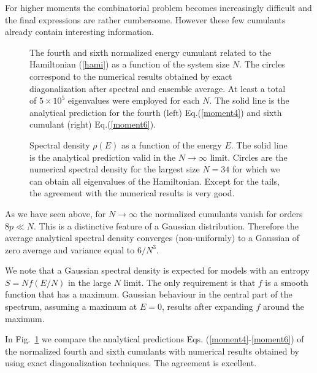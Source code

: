 \documentclass[aps,showpacs,floatfix,superscriptaddress,pre,11pt]{revtex4-1}
\begin{document}
 For higher moments the combinatorial problem becomes increasingly difficult and the final expressions
 are rather cumbersome. However these few cumulants already contain interesting information. 
  \begin{figure}[t!]%
  	\centering
  	\caption{The fourth and sixth normalized energy cumulant related to the Hamiltonian (\ref{hami}) as a function of the system size $N$. The circles correspond to the numerical results obtained by exact diagonalization after spectral and ensemble average. At least a total of $5\times10^5$ eigenvalues were employed for each $N$. The solid line is the analytical prediction for the fourth (left) Eq.(\ref{moment4}) and sixth cumulant (right) Eq.(\ref{moment6}). }
  	\label{fig1}
  \end{figure}


 
   \begin{figure}[t]%
   	\centering
   	\caption{Spectral density $\rho(E)$ as a function of the energy $E$. The solid line is the analytical prediction valid in the $N \to \infty$ limit. Circles are the numerical spectral density for the largest size $N=34$ for which we can obtain all eigenvalues of the Hamiltonian. Except for the tails, the agreement with the numerical results is very good.}
   	\label{fig2}
   \end{figure}
As we have seen above, for $N \to \infty$ the normalized cumulants vanish for orders $8p \ll N$. This is a distinctive feature of a Gaussian distribution. Therefore the average analytical spectral density converges (non-uniformly)
 to a Gaussian of zero average and variance equal to
 $6/N^3$.
 
 We note that a Gaussian spectral density is expected for models with an entropy
 $S = N f(E/N)$ in the large $N$ limit. The only requirement is that $f$ is a smooth function that
 has a maximum. Gaussian behaviour in the central part of the spectrum, assuming a maximum at $E = 0$, results after expanding $f$ around the maximum.
 
 
  
 In Fig.~\ref{fig1}  we compare the analytical predictions
 Eqs. (\ref{moment4}-\ref{moment6}) of the normalized fourth and sixth
 cumulants with numerical results obtained by using exact diagonalization techniques. The agreement is excellent. 
  
\end{document}
